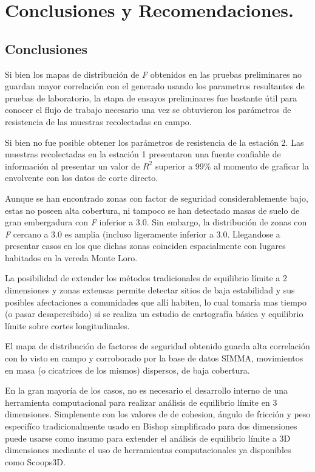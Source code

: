 

\chapter{Conclusiones y Recomendaciones.}

\section{Conclusiones}

Si bien los mapas de distribuci\'on de \textit{F} obtenidos en las pruebas preliminares no guardan mayor correlaci\'on con el generado usando los parametros resultantes de pruebas de laboratorio, la etapa de ensayos preliminares fue bastante \'util para conocer el flujo de trabajo necesario una vez se obtuvieron los par\'ametros de resistencia de las muestras recolectadas en campo.

Si bien no fue posible obtener los par\'ametros de resistencia de la estaci\'on 2. Las muestras recolectadas en la estaci\'on 1 presentaron  una  fuente confiable de informaci\'on al presentar un valor de $R^{2}$ superior a 99\% al momento de graficar la envolvente con los datos de corte directo.

Aunque se han encontrado zonas  con factor de seguridad  considerablemente bajo, estas no poseen alta cobertura, ni tampoco se han detectado masas de suelo de gran embergadura con \textit{F} inferior a 3.0. Sin embargo, la distribuci\'on de zonas con \textit{F} cercano a 3.0  es amplia (incluso ligeramente inferior a 3.0. Llegandose a presentar casos en los que dichas zonas coinciden espacialmente con lugares habitados en la vereda Monte Loro.

La posibilidad de extender los m\'etodos tradicionales de equilibrio l\'imite a 2 dimensiones y zonas extensas permite detectar sitios de baja estabilidad y sus posibles afectaciones a comunidades que all\'i habiten, lo cual tomar\'ia mas tiempo (o pasar desapercibido) si se realiza un estudio de cartograf\'ia b\'asica y equilibrio l\'imite sobre cortes longitudinales.

El mapa de distribuci\'on de factores de seguridad obtenido guarda alta correlaci\'on con lo visto en campo y corroborado por la base de datos SIMMA, movimientos en masa (o cicatrices de los mismos) dispersos, de baja cobertura.

En la gran mayor\'ia de los casos, no es necesario el desarrollo interno de una herramienta computacional para realizar an\'alisis de equilibrio l\'imite en 3 dimensiones. Simplenente con los valores de de cohesion, \'angulo de fricci\'on y peso especif\'ico tradicionalmente usado en Bishop simplificado para dos dimensiones puede usarse como insumo para extender el an\'alisis  de equilibrio l\'imite a 3D dimensiones mediante el uso de herramientas computacionales ya disponibles como Scoops3D.

